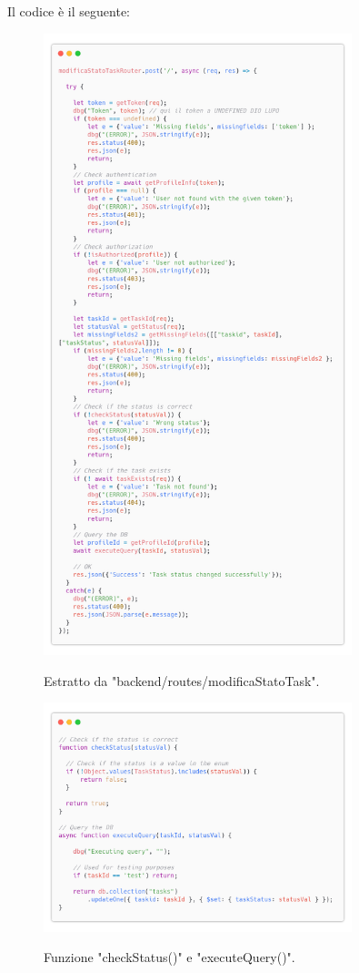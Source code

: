 \documentclass{report}
\begin{document}
Il codice è il seguente:
\begin{figure}[H]
	\centering\includegraphics[width=0.8\textwidth]{images/code_modifica_stato.png}

	Estratto da "backend/routes/modificaStatoTask".
\end{figure}
\begin{figure}[H]
	\centering\includegraphics[width=0.8\textwidth]{images/code_modifica_stato_query.png}

	Funzione "checkStatus()" e "executeQuery()".
\end{figure}
\end{document}
